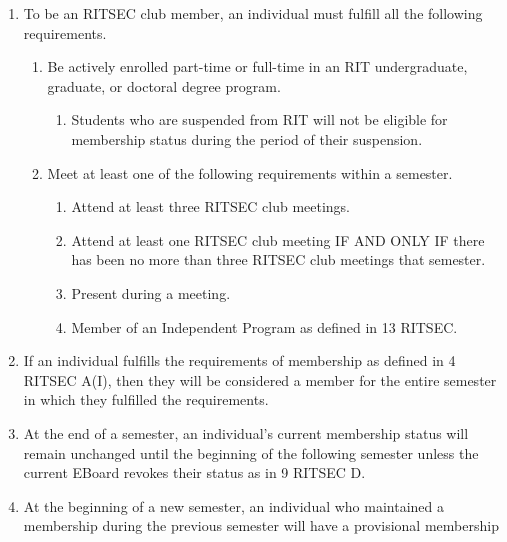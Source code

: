 


\begin{enumerate}
  \item To be an RITSEC club member, an individual must fulfill all the
    following requirements.
  \begin{enumerate}
    \item Be actively enrolled part-time or full-time in an RIT undergraduate,
      graduate, or doctoral degree program.
    \begin{enumerate}
      \item Students who are suspended from RIT will not be eligible for
        membership status during the period of their suspension.
    \end{enumerate}
    \item Meet at least one of the following requirements within a semester.
    \begin{enumerate}
      \item Attend at least three RITSEC club meetings.
      \item Attend at least one RITSEC club meeting IF AND ONLY IF there has
        been no more than three RITSEC club meetings that semester.
      \item Present during a meeting.
      \item Member of an Independent Program as defined in 13 RITSEC.
    \end{enumerate}
  \end{enumerate}
  \item If an individual fulfills the requirements of membership as defined in
    4 RITSEC A(I), then they will be considered a member for the entire
    semester in which they fulfilled the requirements.
  \item At the end of a semester, an individual's current membership status
    will remain unchanged until the beginning of the following semester unless
    the current EBoard revokes their status as in 9 RITSEC D.
  \item At the beginning of a new semester, an individual who maintained a
    membership during the previous semester will have a provisional membership

\end{enumerate}
